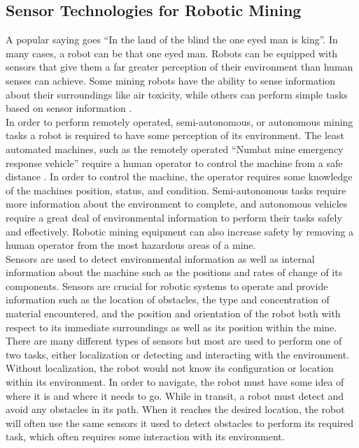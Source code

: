 \subsection{Sensor Technologies for Robotic Mining}

A popular saying goes ``In the land of the blind the one eyed man is king''. In many cases, a robot can be that one eyed man. Robots can be equipped with sensors that give them a far greater perception of their environment than human senses can achieve. Some mining robots have the ability to sense information about their surroundings like air toxicity, while others can perform simple tasks based on sensor information \cite{uground}.\\

In order to perform remotely operated, semi-autonomous, or autonomous mining tasks a robot is required to have some perception of its environment. The least automated machines, such as the remotely operated ``Numbat mine emergency response vehicle'' require a human operator to control the machine from a safe distance \cite{numbat}. In order to control the machine, the operator requires some knowledge of the machines position, status, and condition. Semi-autonomous tasks require more information about the environment to complete, and autonomous vehicles require a great deal of environmental information to perform their tasks safely and effectively. Robotic mining equipment can also increase safety by removing a human operator from the most hazardous areas of a mine.\\

Sensors are used to detect environmental information as well as internal information about the machine such as the positions and rates of change of its components. Sensors are crucial for robotic systems to operate and provide information such as the location of obstacles, the type and concentration of material encountered, and the position and orientation of the robot both with respect to its immediate surroundings as well as its position within the mine. There are many different types of sensors but most are used to perform one of two tasks, either localization or detecting and interacting with the environment. Without localization, the robot would not know its configuration or location within its environment. In order to navigate, the robot must have some idea of where it is and where it needs to go. While in transit, a robot must detect and avoid any obstacles in its path. When it reaches the desired location, the robot will often use the same sensors it used to detect obstacles to perform its required task, which often requires some interaction with its environment.\\

